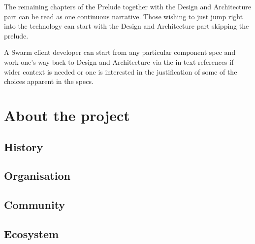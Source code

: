 The remaining chapters of the Prelude together with the Design and Architecture part can be read as one continuous narrative. Those wishing to just jump right into the technology can start with the Design and Architecture part skipping the prelude.

A Swarm client developer can start from any particular component spec and work one's way back to Design and Architecture via the in-text references if wider context is needed or one is interested in the justification of some of the choices apparent in the specs.

\chapter{About the project}\label{sec:about}
\section{History}
\section{Organisation}
\section{Community}
\section{Ecosystem}
